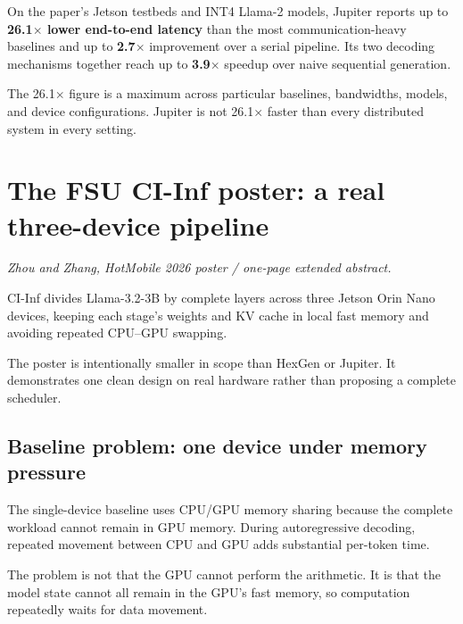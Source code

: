 \documentclass[10pt,a4paper]{article}
\begin{document}
\begin{resultbox}
On the paper's Jetson testbeds and INT4 Llama-2 models, Jupiter reports up to \textbf{26.1$\times$ lower end-to-end latency} than the most communication-heavy baselines and up to \textbf{2.7$\times$} improvement over a serial pipeline. Its two decoding mechanisms together reach up to \textbf{3.9$\times$} speedup over naive sequential generation.
\end{resultbox}

\begin{cautionbox}
The 26.1$\times$ figure is a maximum across particular baselines, bandwidths, models, and device configurations. Jupiter is not 26.1$\times$ faster than every distributed system in every setting.
\end{cautionbox}

\clearpage
\section{The FSU CI-Inf poster: a real three-device pipeline}

\textit{Zhou and Zhang, HotMobile 2026 poster / one-page extended abstract.}

\begin{takeaway}
CI-Inf divides Llama-3.2-3B by complete layers across three Jetson Orin Nano devices, keeping each stage's weights and KV cache in local fast memory and avoiding repeated CPU--GPU swapping.
\end{takeaway}

The poster is intentionally smaller in scope than HexGen or Jupiter. It demonstrates one clean design on real hardware rather than proposing a complete scheduler.

\subsection{Baseline problem: one device under memory pressure}

The single-device baseline uses CPU/GPU memory sharing because the complete workload cannot remain in GPU memory. During autoregressive decoding, repeated movement between CPU and GPU adds substantial per-token time.

\begin{plainbox}
The problem is not that the GPU cannot perform the arithmetic. It is that the model state cannot all remain in the GPU's fast memory, so computation repeatedly waits for data movement.
\end{plainbox}
\end{document}
